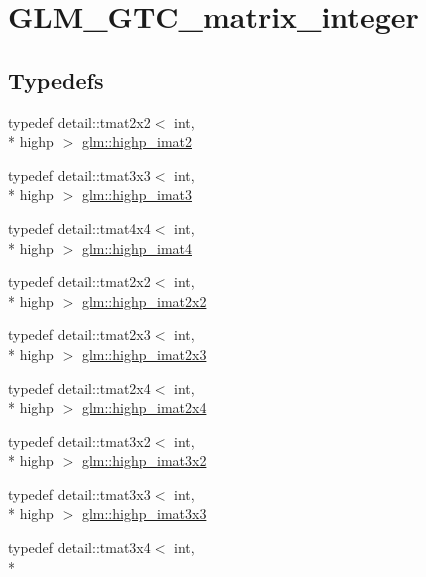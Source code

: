 \hypertarget{group__gtc__matrix__integer}{\section{G\-L\-M\-\_\-\-G\-T\-C\-\_\-matrix\-\_\-integer}
\label{group__gtc__matrix__integer}
}
\subsection*{Typedefs}
\begin{DoxyCompactItemize}
\item 
typedef detail\-::tmat2x2$<$ int, \\*
highp $>$ \hyperlink{group__gtc__matrix__integer_ga70eae282157f23589db24f4664bbf956}{glm\-::highp\-\_\-imat2}
\item 
typedef detail\-::tmat3x3$<$ int, \\*
highp $>$ \hyperlink{group__gtc__matrix__integer_gaf12b3aa7e16a88b1fcf51be9a132048c}{glm\-::highp\-\_\-imat3}
\item 
typedef detail\-::tmat4x4$<$ int, \\*
highp $>$ \hyperlink{group__gtc__matrix__integer_ga9ca2f5624891bd1ac993fcde4dd24ac1}{glm\-::highp\-\_\-imat4}
\item 
typedef detail\-::tmat2x2$<$ int, \\*
highp $>$ \hyperlink{group__gtc__matrix__integer_ga9646ff5ef973234755e63e727c5a37fc}{glm\-::highp\-\_\-imat2x2}
\item 
typedef detail\-::tmat2x3$<$ int, \\*
highp $>$ \hyperlink{group__gtc__matrix__integer_ga7b7079ab95ac8f533ac565fcf1341c76}{glm\-::highp\-\_\-imat2x3}
\item 
typedef detail\-::tmat2x4$<$ int, \\*
highp $>$ \hyperlink{group__gtc__matrix__integer_ga84aec2e744ecac589fe8d502266e8efc}{glm\-::highp\-\_\-imat2x4}
\item 
typedef detail\-::tmat3x2$<$ int, \\*
highp $>$ \hyperlink{group__gtc__matrix__integer_ga9780c1bc052a34c59dc95f4dd9e1a5c8}{glm\-::highp\-\_\-imat3x2}
\item 
typedef detail\-::tmat3x3$<$ int, \\*
highp $>$ \hyperlink{group__gtc__matrix__integer_ga4e7c11e49de5d71067b95a87c84308a8}{glm\-::highp\-\_\-imat3x3}
\item 
typedef detail\-::tmat3x4$<$ int, \\*

\end{DoxyCompactItemize}
